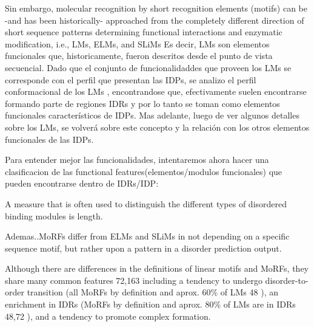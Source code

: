 Sin embargo, molecular recognition by short recognition elements (motifs) can be -and has been historically- approached from the completely different direction of short sequence patterns determining functional interactions and enzymatic modification,
i.e., LMs, ELMs, and SLiMs
Es decir, LMs son elementos funcionales que, historicamente, fueron descritos desde el punto de vista secuencial. 
Dado que el conjunto de funcionalidaddes que proveen los LMs se corresponde con el perfil que presentan las IDPs, se analizo el perfil conformacional de los LMs \cite{fuxreiter2007local}, encontrandose que, efectivamente
suelen encontrarse formando parte de regiones IDRs y por lo tanto se toman como elementos funcionales característicos de IDPs.
Mas adelante, luego de ver algunos detalles sobre los LMs, se volverá sobre este concepto y la relación con los otros elementos funcionales de las IDPs.































% 
% 
 Para entender mejor las funcionalidades, intentaremos ahora hacer una clasificacion de las functional features(elementos/modulos funcionales) que pueden encontrarse dentro de IDRs/IDP:

A measure that is often used to distinguish the different types of disordered binding modules is length.

Ademas..MoRFs differ from ELMs and SLiMs in not depending on a specific sequence motif, but rather upon a pattern in a disorder prediction output. 

Although there are differences in the definitions of linear
motifs and MoRFs, they share many common features 72,163
including a tendency to undergo disorder-to-order transition (all
MoRFs by definition and aprox. 60\% of LMs 48 ), an enrichment in
IDRs (MoRFs by definition and aprox. 80\% of LMs are in IDRs 48,72 ),
and a tendency to promote complex formation.


